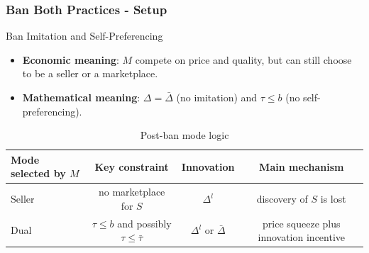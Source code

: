 \begin{frame}
  \frametitle{Ban Both Practices - Setup}
  \small

  \begin{block}{Ban Imitation and Self-Preferencing}
    \begin{itemize}
      \item \textbf{Economic meaning}: $M$ compete on price and quality, but can still choose to be a seller or a marketplace.
      \item \textbf{Mathematical meaning}: $\Delta = \bar{\Delta}$ (no imitation) and $\tau \leq b$ (no self-preferencing).
    \end{itemize}
  \end{block}

  \vspace{-0.15cm}
  \begin{table}
    \centering
    \caption{Post-ban mode logic}
    \label{tab:ban-both-post-ban}
    \scriptsize
    \begin{tabular}{@{}lccc@{}}
      \toprule
      Mode selected by $M$ & Key constraint & Innovation & Main mechanism \\ 
      \midrule
      Seller
        & no marketplace for $S$ & $\Delta^l$ & discovery of $S$ is lost \\ 
      Dual
        & $\tau\leq b$ and possibly $\tau\leq\bar{\tau}$
        & $\Delta^l$ or $\bar{\Delta}$ & price squeeze plus innovation incentive \\ 
      \bottomrule
    \end{tabular}
  \end{table}
\end{frame}

